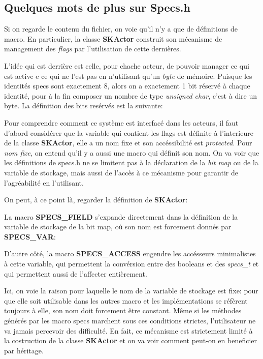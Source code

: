 \documentclass{report}
\begin{document}
\subsection{Quelques mots de plus sur Specs.h}

Si on regarde le contenu du fichier, on voie qu'il n'y a que de définitions de
macro. En particulier, la classe \textbf{SKActor} construit son mécanisme de
management des \textit{flags} par l'utilisation de cette dernières.
\par
\par
L'idée qui est derrière est celle, pour chache acteur, de pouvoir manager ce qui 
est active e ce qui ne l'est pas en n'utilisant qu'un \textit{byte} de mémoire.
Puisque les identités specs sont exactement 8, alors on a exactement 1 bit
réservé à chaque identité, pour à la fin composer un nombre de type
\textit{unsigned char}, c'est à dire un byte.
La définition des bits resérvés est la suivante:



Pour comprendre comment ce système est interfacé dans les acteurs, il faut d'abord
considérer que la variable qui contient les flags est définite à l'interieure de
la classe \textbf{SKActor}, elle a un nom fixe et son accéssibilité est
\textit{protected}. Pour \textit{nom fixe}, on entend qu'il y a aussi une macro qui
définit son nom. On va voir que les définitions de specs.h ne se limitent pas à
la déclaration de la \textit{bit map} ou de la variable de stockage, mais aussi 
de l'accès à ce mécanisme pour garantir de l'agréabilité en l'utilisant.
\par
On peut, à ce point là, regarder la définition de \textbf{SKActor}:



La macro \textbf{SPECS\_FIELD} s'expande directement dans la définition de 
la variable de stockage de la bit map, où son nom est forcement donnés par
\textbf{SPECS\_VAR}:



D'autre côté, la macro \textbf{SPECS\_ACCESS} engendre les accésseurs minimalistes à cette
variable, qui permettent la convérsion entre des booleans et des
\textit{specs\_t} et qui permettent aussi de l'affecter entièrement.



Ici, on voie la raison pour laquelle le nom de la variable de stockage est fixe:
pour que elle soit utilisable dans les autres macro et les implémentations se
réfèrent toujours à elle, son nom doit forcement être constant.
Même si les méthodes générés par les macro specs marchent sous ces conditions
strictes, l'utilisateur ne va jamais percevoir des difficulté. En fait, ce
mécanisme est strictement limité à la costruction de la classe \textbf{SKActor}
et on va voir comment peut-on en beneficier par héritage.
\end{document}
